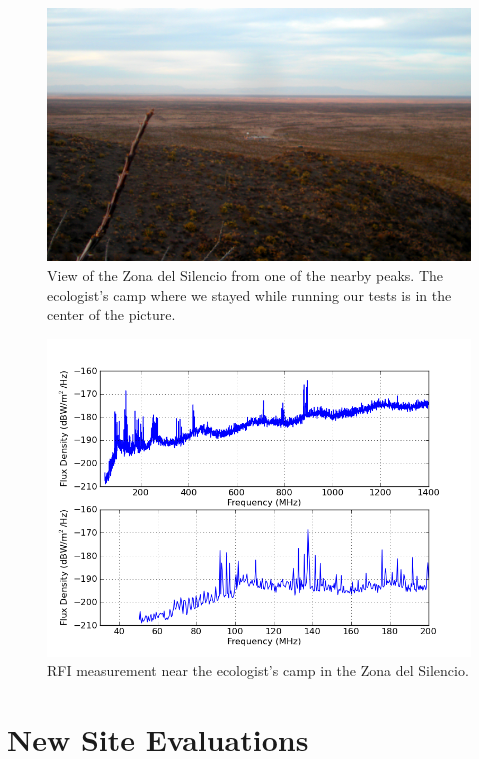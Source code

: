 \begin{figure}[htb]
\begin{center}
\includegraphics[width=0.9\linewidth]{RFI_testing/figures/zds_overview_shot.jpg}
\caption{View of the Zona del Silencio from one of the nearby peaks. The ecologist's camp where we stayed while running our tests is in the center of the picture.}
\label{Fig:zdsover}
\end{center}
\end{figure}

\begin{figure}[htb]
\begin{center}
\includegraphics[width=0.9\linewidth]{RFI_testing/figures/ZdS_halfway_in_cal.png}
\caption{RFI measurement near the ecologist's camp in the Zona del Silencio.}
\label{Fig:zdsendrfi}
\end{center}
\end{figure}

\section{New Site Evaluations}

